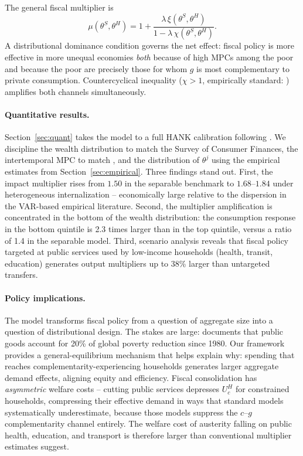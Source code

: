 The general fiscal multiplier is
\begin{equation}\label{eq:multiplier-intro}
  \mu(\theta^{S},\theta^{H}) = 1 +
  \frac{\lambda\,\xi(\theta^{S},\theta^{H})}
       {1-\lambda\,\chi(\theta^{S},\theta^{H})}.
\end{equation}
A distributional dominance condition governs the net effect: fiscal policy is
more effective in more unequal economies \emph{both} because of high MPCs among
the poor and because the poor are precisely those for whom $g$ is most
complementary to private consumption. Countercyclical inequality
($\chi>1$, empirically standard: \citealp{Bilbiie2025,Patterson2023}) amplifies
both channels simultaneously.

\paragraph{Quantitative results.}
Section~\ref{sec:quant} takes the model to a full HANK calibration following
\citet{KaplanMollViolante2018}. We discipline the wealth distribution to match
the Survey of Consumer Finances, the intertemporal MPC to match
\citet{Fagereng2021}, and the distribution of $\theta^{j}$ using the empirical
estimates from Section~\ref{sec:empirical}. Three findings stand out. First, the
impact multiplier rises from $1.50$ in the separable benchmark to $1.68$--$1.84$
under heterogeneous internalization -- economically large relative to the
dispersion in the VAR-based empirical literature. Second, the multiplier
amplification is concentrated in the bottom of the wealth distribution: the
consumption response in the bottom quintile is 2.3 times larger than in the top
quintile, versus a ratio of 1.4 in the separable model. Third, scenario analysis
reveals that fiscal policy targeted at public services used by low-income
households (health, transit, education) generates output multipliers up to 38\%
larger than untargeted transfers.

\paragraph{Policy implications.}
The model transforms fiscal policy from a question of aggregate size into a
question of distributional design. The stakes are large: \citet{Gethin2023}
documents that public goods account for 20\% of global poverty reduction since
1980. Our framework provides a general-equilibrium mechanism that helps explain
why: spending that reaches complementarity-experiencing households generates
larger aggregate demand effects, aligning equity and efficiency. Fiscal
consolidation has \emph{asymmetric} welfare costs -- cutting public services
depresses $U^{H}_{c}$ for constrained households, compressing their effective
demand in ways that standard models systematically underestimate, because those
models suppress the $c$--$g$ complementarity channel entirely. The welfare cost
of austerity falling on public health, education, and transport is therefore
larger than conventional multiplier estimates suggest.

